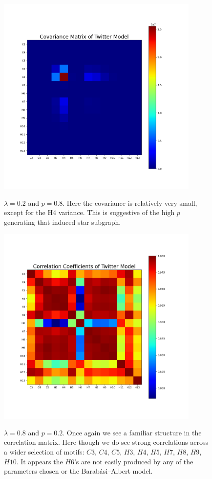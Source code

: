 \begin{figure}
    \includegraphics[width=10cm]{Images/CovMatTwitterModel020809.png}\
    \centering
    \caption{$\lambda=0.2$ and $p=0.8$. Here the covariance is relatively 
    very small, except for the H4 variance. This is suggestive of 
    the high $p$ generating that induced star subgraph.}
    \label{fig:covmat0208}
\end{figure}

\begin{figure}
    \includegraphics[width=10cm]{Images/CorrCoefTwitterModel080209.png}\
    \centering
    \caption{$\lambda=0.8$ and $p=0.2$. Once again we see a familiar structure
    in the correlation matrix. Here though we do see strong correlations 
    across a wider selection of motifs: $C3$, $C4$, $C5$, $H3$, $H4$, $H5$, $H7$, $H8$, $H9$, $H10$. It appears
    the $H6$'s are not easily produced by any of the parameters chosen or the 
    Barabási–Albert model.}
\end{figure}

